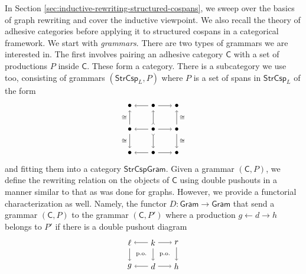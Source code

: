 \documentclass{amsart}
\newcommand{\iso}{\cong}
\newcommand{\C}{\cat{C}}
\newcommand{\Gram}{\cat{Gram}}
\newcommand{\StrCsp}{\cat{StrCsp}}
\newcommand{\StrCspGram}{\cat{StrCspGram}}
\newcommand{\cat}[1]{\mathsf{#1}}
\newcommand{\from}{\colon}
\renewcommand{\gets}{\leftarrow}
\theoremstyle{remark}
\theoremstyle{definition}
\begin{document}
In Section \ref{sec:inductive-rewriting-structured-cospans}, we sweep
over the basics of graph rewriting and cover the inductive viewpoint.
We also recall the theory of adhesive categories before applying it to
structured cospans in a categorical framework. We start with
\emph{grammars}. There are two types of grammars we are interested in.
The first involves pairing an adhesive category $ \C $ with a set of
productions $ P $ inside $ \C $. These form a category.  There is a
subcategory we use too, consisting of grammars $ ( \StrCsp_L , P ) $
where $ P $ is a set of spans in $ \StrCsp_L $ of the form
%
\[
  \begin{tikzpicture}
    \node (1t) at (0,2) {$ \bullet $};
    \node (2t) at (1,2) {$ \bullet $};
    \node (3t) at (2,2) {$ \bullet $};
    \node (1m) at (0,1) {$ \bullet $};
    \node (2m) at (1,1) {$ \bullet $};
    \node (3m) at (2,1) {$ \bullet $};
    \node (1b) at (0,0) {$ \bullet $};
    \node (2b) at (1,0) {$ \bullet $};
    \node (3b) at (2,0) {$ \bullet $};
    \draw [->] (2t) to node [] {\scriptsize{$  $}} (1t);
    \draw [->] (2t) to node [] {\scriptsize{$  $}} (3t);
    \draw [->] (2m) to node [] {\scriptsize{$  $}} (1m);
    \draw [->] (2m) to node [] {\scriptsize{$  $}} (3m);
    \draw [->] (2b) to node [] {\scriptsize{$  $}} (1b);
    \draw [->] (2b) to node [] {\scriptsize{$  $}} (3b);
    \draw [->] (1m) to node [left] {\scriptsize{$ \iso $}} (1t);
    \draw [->] (1m) to node [left] {\scriptsize{$ \iso $}} (1b);
    \draw [>->] (2m) to node [] {\scriptsize{$  $}} (2t);
    \draw [>->] (2m) to node [] {\scriptsize{$  $}} (2b);
    \draw [->] (3m) to node [right] {\scriptsize{$ \iso $}} (3t);
    \draw [->] (3m) to node [right] {\scriptsize{$ \iso $}} (3b);
  \end{tikzpicture}
\]
% 
and fitting them into a category $ \StrCspGram $.  Given a grammar
$ ( \C , P ) $, we define the rewriting relation on the objects
of $ \C $ using double pushouts in a manner similar to that as
was done for graphs.  However, we provide a functorial characterization
as well. Namely, the functor $ D \from \Gram \to \Gram $
that send a grammar $ ( \C , P ) $ to the grammar $ ( \C
, P') $ where a production $ g \gets d \to h $ belongs to $ P' $ if
there is a double pushout diagram
%
\[
  \begin{tikzpicture}
    \node (1t) at (0,1) {$ \ell $};
    \node (2t) at (1,1) {$ k $};
    \node (3t) at (2,1) {$ r $};
    \node (1b) at (0,0) {$ g $};
    \node (2b) at (1,0) {$ d $};
    \node (3b) at (2,0) {$ h $};
    \draw [->] (2t) to node [] {\scriptsize{$  $}} (1t);
    \draw [->] (2t) to node [] {\scriptsize{$  $}} (3t);
    \draw [->] (2b) to node [] {\scriptsize{$  $}} (1b);
    \draw [->] (2b) to node [] {\scriptsize{$  $}} (3b);
    \draw [->] (1t) to node [] {\scriptsize{$  $}} (1b);
    \draw [->] (2t) to node [] {\scriptsize{$  $}} (2b);
    \draw [->] (3t) to node [] {\scriptsize{$  $}} (3b);
    \node () at (0.5,0.5) {\scriptsize{p.o.}};
    \node () at (1.5,0.5) {\scriptsize{p.o.}};
  \end{tikzpicture}
\]
\end{document}
